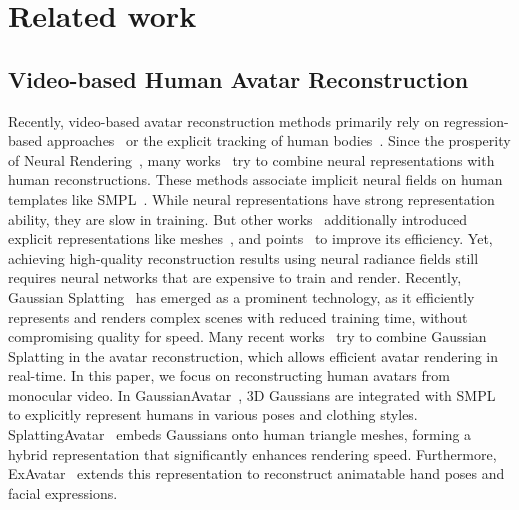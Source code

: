 
\section{Related work}



\subsection{Video-based Human Avatar Reconstruction}
Recently, video-based avatar reconstruction methods primarily rely on regression-based approaches~\cite{he2020geo,he2021arch++,huang2020arch,saito2019pifu,saito2020pifuhd,xiu2022icon,xiu2023econ,zheng2021pamir} or the explicit tracking of human bodies~\cite{habermann2020deepcap,habermann2019livecap,xu2018monoperfcap,alldieck2018video,casado2022pergamo,guo2021human,moon20223d}.
Since the prosperity of Neural Rendering~\cite{mildenhall2021nerf}, many works~\cite{li2022tava,li2023posevocab,liu2021neural,peng2021neural,peng2024animatable,wang2022arah,zheng2022structured,jiang2022selfrecon,jiang2022neuman,su2021nerf,su2022danbo,su2023npc,weng2022humannerf,guo2023vid2avatar,yu2023monohuman} try to combine neural representations with human reconstructions. These methods associate implicit neural fields on human templates like SMPL~\cite{SMPL:2015}. While neural representations have strong representation ability, they are slow in training. But other works~\cite{zhao2022high,huang2023efficient,zheng2023pointavatar,instant_nvr} additionally introduced explicit representations like meshes~\cite{zhao2022high,huang2023efficient}, and points~\cite{zheng2023pointavatar} to improve its efficiency. Yet, achieving high-quality reconstruction results using neural radiance fields still requires neural networks that are expensive to train and render. Recently, Gaussian Splatting~\cite{kerbl3Dgaussians} has emerged as a prominent technology, as it efficiently represents and renders complex scenes with reduced training time, without compromising quality for speed. Many recent works~\cite{lei2023gart,li2023animatable,yin2023humanrecon,zheng2023gps,hu2023gauhuman,jiang2023hifi4g,li2023human101,hu2023gaussianavatar,qian20233dgs,qian20233dgsavatar,zheng2024gpsgaussian,liu24-GVA,reloo,kim2024moconerf,pramishp2024iHuman} try to combine Gaussian Splatting in the avatar reconstruction, which allows efficient avatar rendering in real-time. In this paper, we focus on reconstructing human avatars from monocular video. In GaussianAvatar~\cite{hu2023gaussianavatar}, 3D Gaussians are integrated with SMPL~\cite{SMPL:2015} to explicitly represent humans in various poses and clothing styles. SplattingAvatar~\cite{shao2024splattingavatar} embeds Gaussians onto human triangle meshes, forming a hybrid representation that significantly enhances rendering speed. Furthermore, ExAvatar~\cite{moon2024exavatar} extends this representation to reconstruct animatable hand poses and facial expressions.
